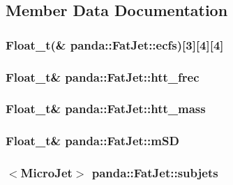 \subsection{Member Data Documentation}
\hypertarget{classpanda_1_1FatJet_ab4fca3ce4af63d1b8ef1a450ec945668}{
\subsubsection[{ecfs}]{\setlength{\rightskip}{0pt plus 5cm}Float\_\-t(\& {\bf panda::FatJet::ecfs})\mbox{[}3\mbox{]}\mbox{[}4\mbox{]}\mbox{[}4\mbox{]}}}
\label{classpanda_1_1FatJet_ab4fca3ce4af63d1b8ef1a450ec945668}
\hypertarget{classpanda_1_1FatJet_a9237481670015ed3793e4729fd337662}{
\subsubsection[{htt\_\-frec}]{\setlength{\rightskip}{0pt plus 5cm}Float\_\-t\& {\bf panda::FatJet::htt\_\-frec}}}
\label{classpanda_1_1FatJet_a9237481670015ed3793e4729fd337662}
\hypertarget{classpanda_1_1FatJet_aeb5265d526d4d970f2c49d98f8e5f418}{
\subsubsection[{htt\_\-mass}]{\setlength{\rightskip}{0pt plus 5cm}Float\_\-t\& {\bf panda::FatJet::htt\_\-mass}}}
\label{classpanda_1_1FatJet_aeb5265d526d4d970f2c49d98f8e5f418}
\hypertarget{classpanda_1_1FatJet_a7c462ec73f49ac541b4597d3942236a7}{
\subsubsection[{mSD}]{\setlength{\rightskip}{0pt plus 5cm}Float\_\-t\& {\bf panda::FatJet::mSD}}}
\label{classpanda_1_1FatJet_a7c462ec73f49ac541b4597d3942236a7}
\hypertarget{classpanda_1_1FatJet_af34aeaf274c73856e950a21450dec129}{
\subsubsection[{subjets}]{$<${\bf MicroJet}$>$ {\bf panda::FatJet::subjets}}}
